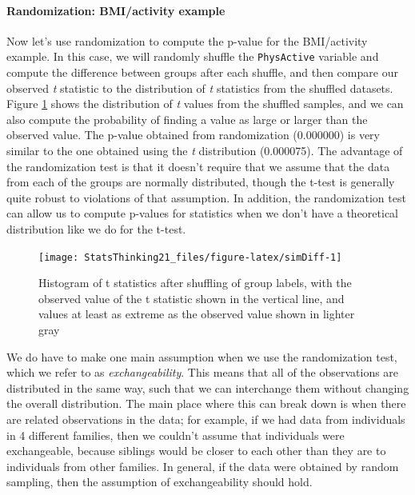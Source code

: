 \documentclass[
  12pt,
]{book}
\begin{document}
\hypertarget{randomization-bmiactivity-example}{%
\paragraph{Randomization: BMI/activity example}\label{randomization-bmiactivity-example}}

Now let's use randomization to compute the p-value for the BMI/activity example. In this case, we will randomly shuffle the \texttt{PhysActive} variable and compute the difference between groups after each shuffle, and then compare our observed \emph{t} statistic to the distribution of \emph{t} statistics from the shuffled datasets. Figure \ref{fig:simDiff} shows the distribution of \emph{t} values from the shuffled samples, and we can also compute the probability of finding a value as large or larger than the observed value. The p-value obtained from randomization (0.000000) is very similar to the one obtained using the \emph{t} distribution (0.000075). The advantage of the randomization test is that it doesn't require that we assume that the data from each of the groups are normally distributed, though the t-test is generally quite robust to violations of that assumption. In addition, the randomization test can allow us to compute p-values for statistics when we don't have a theoretical distribution like we do for the t-test.

\begin{figure}
\texttt{[image: StatsThinking21\_files/figure-latex/simDiff-1]} \caption{Histogram of t statistics after shuffling of group labels, with the observed value of the t statistic shown in the vertical line, and values at least as extreme as the observed value shown in lighter gray}\label{fig:simDiff}
\end{figure}

We do have to make one main assumption when we use the randomization test, which we refer to as \emph{exchangeability}. This means that all of the observations are distributed in the same way, such that we can interchange them without changing the overall distribution. The main place where this can break down is when there are related observations in the data; for example, if we had data from individuals in 4 different families, then we couldn't assume that individuals were exchangeable, because siblings would be closer to each other than they are to individuals from other families. In general, if the data were obtained by random sampling, then the assumption of exchangeability should hold.
\end{document}
